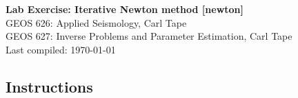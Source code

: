 \documentclass[11pt,titlepage,fleqn]{article}
\begin{document}

\begin{spacing}{1.2}
\centering
{\large \bf Lab Exercise: Iterative Newton method [newton]} \\
GEOS 626: Applied Seismology, Carl Tape \\
GEOS 627: Inverse Problems and Parameter Estimation, Carl Tape \\
Last compiled: \today
\end{spacing}


\subsection*{Instructions}
\end{document}
